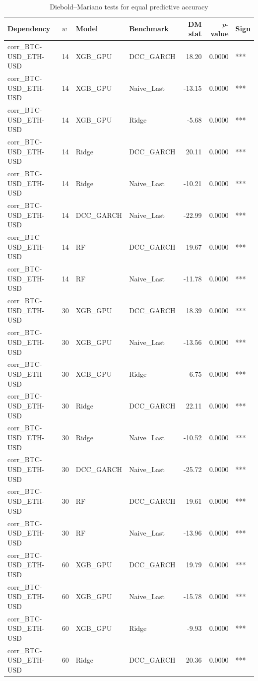 \begin{table}[H]
\centering
\small
\caption{Diebold--Mariano tests for equal predictive accuracy}
\label{tab:dm_tests}
\begin{tabular}{llllrrl}
\toprule
Dependency & $w$ & Model & Benchmark & DM stat & $p$-value & Sign \\
\midrule
corr_BTC-USD_ETH-USD & 14 & XGB_GPU & DCC_GARCH & 18.20 & 0.0000 & *** \\
corr_BTC-USD_ETH-USD & 14 & XGB_GPU & Naive_Last & -13.15 & 0.0000 & *** \\
corr_BTC-USD_ETH-USD & 14 & XGB_GPU & Ridge & -5.68 & 0.0000 & *** \\
corr_BTC-USD_ETH-USD & 14 & Ridge & DCC_GARCH & 20.11 & 0.0000 & *** \\
corr_BTC-USD_ETH-USD & 14 & Ridge & Naive_Last & -10.21 & 0.0000 & *** \\
corr_BTC-USD_ETH-USD & 14 & DCC_GARCH & Naive_Last & -22.99 & 0.0000 & *** \\
corr_BTC-USD_ETH-USD & 14 & RF & DCC_GARCH & 19.67 & 0.0000 & *** \\
corr_BTC-USD_ETH-USD & 14 & RF & Naive_Last & -11.78 & 0.0000 & *** \\
corr_BTC-USD_ETH-USD & 30 & XGB_GPU & DCC_GARCH & 18.39 & 0.0000 & *** \\
corr_BTC-USD_ETH-USD & 30 & XGB_GPU & Naive_Last & -13.56 & 0.0000 & *** \\
corr_BTC-USD_ETH-USD & 30 & XGB_GPU & Ridge & -6.75 & 0.0000 & *** \\
corr_BTC-USD_ETH-USD & 30 & Ridge & DCC_GARCH & 22.11 & 0.0000 & *** \\
corr_BTC-USD_ETH-USD & 30 & Ridge & Naive_Last & -10.52 & 0.0000 & *** \\
corr_BTC-USD_ETH-USD & 30 & DCC_GARCH & Naive_Last & -25.72 & 0.0000 & *** \\
corr_BTC-USD_ETH-USD & 30 & RF & DCC_GARCH & 19.61 & 0.0000 & *** \\
corr_BTC-USD_ETH-USD & 30 & RF & Naive_Last & -13.96 & 0.0000 & *** \\
corr_BTC-USD_ETH-USD & 60 & XGB_GPU & DCC_GARCH & 19.79 & 0.0000 & *** \\
corr_BTC-USD_ETH-USD & 60 & XGB_GPU & Naive_Last & -15.78 & 0.0000 & *** \\
corr_BTC-USD_ETH-USD & 60 & XGB_GPU & Ridge & -9.93 & 0.0000 & *** \\
corr_BTC-USD_ETH-USD & 60 & Ridge & DCC_GARCH & 20.36 & 0.0000 & *** \\

\end{tabular}
\end{table}
